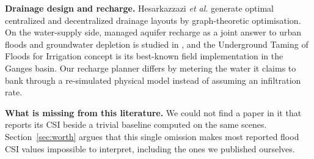 \documentclass[journal]{IEEEtran}
\begin{document}
\textbf{Drainage design and recharge.} Hesarkazzazi \emph{et al.} \cite{hesarkazzazi2022} generate
optimal centralized and decentralized drainage layouts by graph-theoretic optimisation. On the
water-supply side, managed aquifer recharge as a joint answer to urban floods and groundwater
depletion is studied in \cite{mar2026}, and the Underground Taming of Floods for Irrigation concept
\cite{pavelic2015utfi} is its best-known field implementation in the Ganges basin. Our recharge
planner differs by metering the water it claims to bank through a re-simulated physical model
instead of assuming an infiltration rate.

\textbf{What is missing from this literature.} We could not find a paper in it that reports its CSI
beside a trivial baseline computed on the same scenes. Section~\ref{sec:worth} argues that this
single omission makes most reported flood CSI values impossible to interpret, including the ones we
published ourselves.





\end{document}
